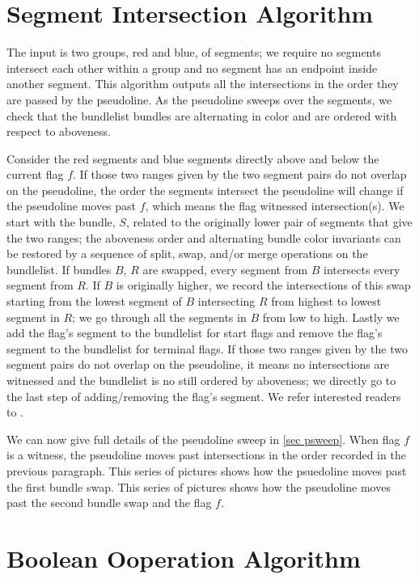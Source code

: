 \documentclass[11pt]{article}
\begin{document}
\section{Segment Intersection Algorithm} \label{sec inter}
The input is two groups, red and blue, of segments; we require no segments intersect each other within a group and no segment has an endpoint inside another segment.
This algorithm outputs all the intersections in the order they are passed by the pseudoline.
As the pseudoline sweeps over the segments, we check that the bundlelist bundles are alternating in color and are ordered with respect to aboveness.

Consider the red segments and blue segments directly above and below the current flag $f$. 
If those two ranges given by the two segment pairs do not overlap on the pseudoline, the order the segments intersect the pseudoline will change if the pseudoline moves past $f$, which means the flag witnessed intersection(s).
We start with the bundle, $S$, related to the originally lower pair of segments that give the two ranges; the aboveness order and alternating bundle color invariants can be restored by a sequence of split, swap, and/or merge operations on the bundlelist.
If bundles $B$, $R$ are swapped, every segment from $B$ intersects every segment from $R$.
If $B$ is originally higher, we record the intersections of this swap starting from the lowest segment of $B$ intersecting $R$ from highest to lowest segment in $R$; we go through all the segments in $B$ from low to high.
Lastly we add the flag's segment to the bundlelist for start flags and remove the flag's segment to the bundlelist for terminal flags.
If those two ranges given by the two segment pairs do not overlap on the pseudoline, it means no intersections are witnessed and the bundlelist is no still ordered by aboveness; we directly go to the last step of adding/removing the flag's segment.
We refer interested readers to \cite{MS}.

We can now give full details of the pseudoline sweep in \ref{sec psweep}.
When flag $f$ is a witness, the pseudoline moves past intersections in the order recorded in the previous paragraph.
This series of pictures shows how the psuedoline moves past the first bundle swap.
This series of pictures shows how the pseudoline moves past the second bundle swap and the flag $f$.

\section{Boolean Ooperation Algorithm}
\end{document}
